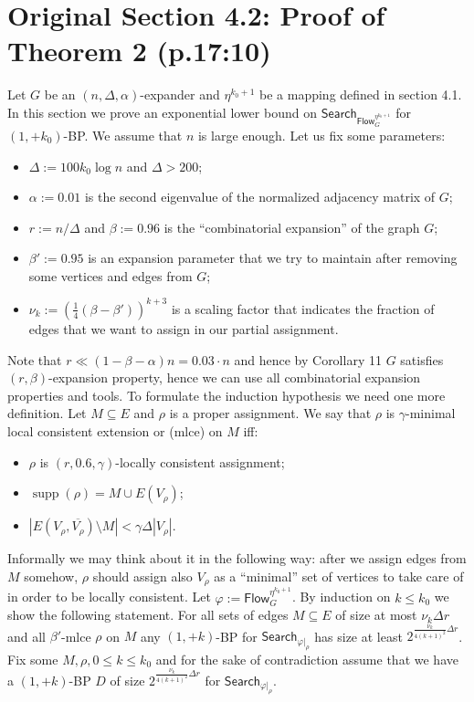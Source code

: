 \documentclass[10pt,a4paper]{article}
\newcommand{\Search}{\mathsf{Search}}
\newcommand{\Flow}{\mathsf{Flow}}
\newcommand{\supp}{\operatorname{supp}}
\begin{document}
\section*{Original Section 4.2: Proof of Theorem 2 (p.17:10)}
Let $G$ be an $(n,\Delta,\alpha)$-expander and $\eta^{k_0+1}$ be a mapping defined in section 4.1. In this section we prove an exponential lower bound on $\Search_{\Flow_G^{\eta^{k_0+1}}}$ for $(1,+k_0)$-BP. We assume that $n$ is large enough.
Let us fix some parameters:
\begin{itemize}
\item $\Delta:=100k_0\log n$ and $\Delta>200$;
\item $\alpha:=0.01$ is the second eigenvalue of the normalized adjacency matrix of $G$;
\item $r:=n/\Delta$ and $\beta:=0.96$ is the ``combinatorial expansion'' of the graph $G$;
\item $\beta':=0.95$ is an expansion parameter that we try to maintain after removing some vertices and edges from $G$;
\item $\nu_k:=(\tfrac14(\beta-\beta'))^{k+3}$ is a scaling factor that indicates the fraction of edges that we want to assign in our partial assignment.
\end{itemize}
Note that $r\ll(1-\beta-\alpha)n=0.03\cdot n$ and hence by Corollary 11 $G$ satisfies $(r,\beta)$-expansion property, hence we can use all combinatorial expansion properties and tools.
To formulate the induction hypothesis we need one more definition. Let $M\subseteq E$ and $\rho$ is a proper assignment. We say that $\rho$ is $\gamma$-minimal local consistent extension or (mlce) on $M$ iff:
\begin{itemize}\item $\rho$ is $(r,0.6,\gamma)$-locally consistent assignment;
\item $\supp(\rho)=M\cup E(V_\rho)$;
\item $|E(V_\rho,\overline{V_\rho})\setminus M|<\gamma\Delta|V_\rho|$.\end{itemize}
Informally we may think about it in the following way: after we assign edges from $M$ somehow, $\rho$ should assign also $V_\rho$ as a ``minimal'' set of vertices to take care of in order to be locally consistent.
Let $\varphi:=\Flow_G^{\eta^{k_0+1}}$. By induction on $k\le k_0$ we show the following statement. For all sets of edges $M\subseteq E$ of size at most $\nu_k\Delta r$ and all $\beta'$-mlce $\rho$ on $M$ any $(1,+k)$-BP for $\Search_{\varphi|_\rho}$ has size at least $2^{\frac{\nu_k}{4(k+1)^2}\Delta r}$.
Fix some $M,\rho,0\le k\le k_0$ and for the sake of contradiction assume that we have a $(1,+k)$-BP $D$ of size $2^{\frac{\nu_k}{4(k+1)^2}\Delta r}$ for $\Search_{\varphi|_\rho}$.
\end{document}
